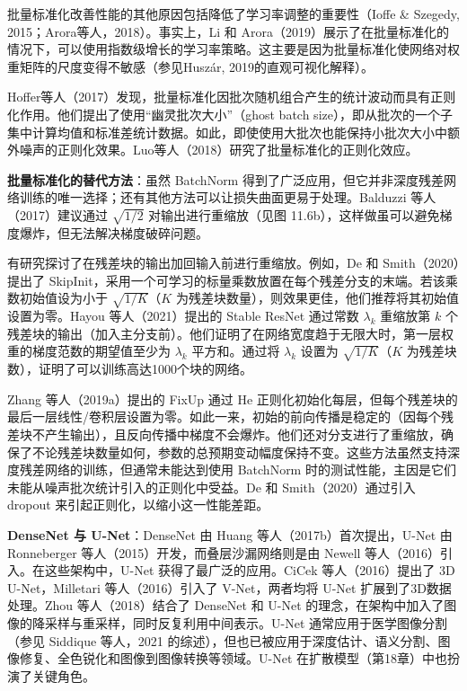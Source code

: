 批量标准化改善性能的其他原因包括降低了学习率调整的重要性（Ioffe \& Szegedy, 2015；Arora等人，2018）。事实上，Li 和 Arora（2019）展示了在批量标准化的情况下，可以使用指数级增长的学习率策略。这主要是因为批量标准化使网络对权重矩阵的尺度变得不敏感（参见Huszár, 2019的直观可视化解释）。

Hoffer等人（2017）发现，批量标准化因批次随机组合产生的统计波动而具有正则化作用。他们提出了使用“幽灵批次大小”（ghost batch size），即从批次的一个子集中计算均值和标准差统计数据。如此，即使使用大批次也能保持小批次大小中额外噪声的正则化效果。Luo等人（2018）研究了批量标准化的正则化效应。

\textbf{批量标准化的替代方法}：虽然 BatchNorm 得到了广泛应用，但它并非深度残差网络训练的唯一选择；还有其他方法可以让损失曲面更易于处理。Balduzzi 等人（2017）建议通过 \(\sqrt{1/2}\) 对输出进行重缩放（见图 11.6b），这样做虽可以避免梯度爆炸，但无法解决梯度破碎问题。

有研究探讨了在残差块的输出加回输入前进行重缩放。例如，De 和 Smith（2020）提出了 SkipInit，采用一个可学习的标量乘数放置在每个残差分支的末端。若该乘数初始值设为小于 \(\sqrt{1/K}\)（\(K\) 为残差块数量），则效果更佳，他们推荐将其初始值设置为零。Hayou 等人（2021）提出的 Stable ResNet 通过常数 \(\lambda_k\) 重缩放第 \(k\) 个残差块的输出（加入主分支前）。他们证明了在网络宽度趋于无限大时，第一层权重的梯度范数的期望值至少为 \(\lambda_k\) 平方和。通过将 \(\lambda_k\) 设置为 \(\sqrt{1/K}\)（\(K\) 为残差块数），证明了可以训练高达1000个块的网络。

Zhang 等人（2019a）提出的 FixUp 通过 He 正则化初始化每层，但每个残差块的最后一层线性/卷积层设置为零。如此一来，初始的前向传播是稳定的（因每个残差块不产生输出），且反向传播中梯度不会爆炸。他们还对分支进行了重缩放，确保了不论残差块数量如何，参数的总预期变动幅度保持不变。这些方法虽然支持深度残差网络的训练，但通常未能达到使用 BatchNorm 时的测试性能，主因是它们未能从噪声批次统计引入的正则化中受益。De 和 Smith（2020）通过引入 dropout 来引起正则化，以缩小这一性能差距。

\textbf{DenseNet 与 U-Net}：DenseNet 由 Huang 等人（2017b）首次提出，U-Net 由 Ronneberger 等人（2015）开发，而叠层沙漏网络则是由 Newell 等人（2016）引入。在这些架构中，U-Net 获得了最广泛的应用。CiCek 等人（2016）提出了 3D U-Net，Milletari 等人（2016）引入了 V-Net，两者均将 U-Net 扩展到了3D数据处理。Zhou 等人（2018）结合了 DenseNet 和 U-Net 的理念，在架构中加入了图像的降采样与重采样，同时反复利用中间表示。U-Net 通常应用于医学图像分割（参见 Siddique 等人，2021 的综述），但也已被应用于深度估计、语义分割、图像修复、全色锐化和图像到图像转换等领域。U-Net 在扩散模型（第18章）中也扮演了关键角色。


